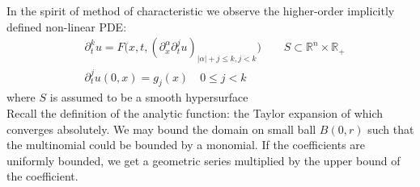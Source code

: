 In the spirit of method of characteristic we observe the higher-order implicitly defined non-linear PDE:
\begin{align*}
	& \partial_t^k u =  F\bigg(x, t, (\partial_x^\alpha \partial_t^j u)_{ |\alpha| + j \le k, j < k } \bigg) \qquad S \subset \mathbb{R}^n \times \mathbb{R}_+ \\
	& \partial_t^j  u (0, x) = g_j(x)   \quad 0 \le j < k
\end{align*}
where $S$ is assumed to be a smooth hypersurface \\
Recall the definition of the analytic function: the Taylor expansion of which converges absolutely. We may bound the domain on small ball $B(0, r)$ such that the multinomial could be bounded by a monomial. If the coefficients are uniformly bounded, we get a geometric series multiplied by the upper bound of the coefficient. 

\begin{lemma}
\end{lemma}

